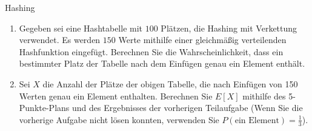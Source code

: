 \documentclass[11pt,a4paper]{article}
\begin{document}
\thispagestyle{empty}
\DeclareRobustCommand{\ttfamily}{\fontencoding{T1}\fontfamily{lmtt}\selectfont}

\newcommand{\quotes}[1]{\glqq{}#1\grqq{}}





\begin{aufgabe}{1}{Hashing}
    \begin{enumerate}
        \item Gegeben sei eine Hashtabelle mit $100$ Plätzen, die Hashing mit Verkettung verwendet.
        Es werden $150$ Werte mithilfe einer gleichmäßig verteilenden Hashfunktion eingefügt.
        Berechnen Sie die Wahrscheinlichkeit, dass ein bestimmter Platz der Tabelle nach dem Einfügen genau ein Element enthält.
        \item Sei $X$ die Anzahl der Plätze der obigen Tabelle, die nach Einfügen von 150 Werten genau ein Element enthalten.
        Berechnen Sie $E[X]$ mithilfe des 5-Punkte-Plans und des Ergebnisses der vorherigen Teilaufgabe (Wenn Sie die vorherige Aufgabe nicht lösen konnten, verwenden Sie $P(\text{ein Element}) = \frac{1}{3}$).
    \end{enumerate}
\end{aufgabe}
\end{document}
